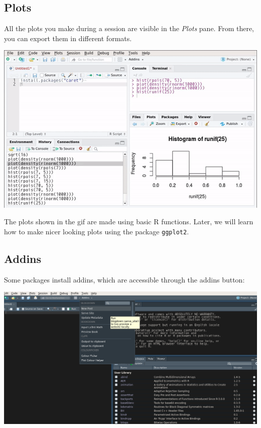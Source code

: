 \documentclass[]{gitbook}
\theoremstyle{definition}
\theoremstyle{definition}
\theoremstyle{definition}
\theoremstyle{remark}
\begin{document}
\hypertarget{plots}{%
\subsection{Plots}\label{plots}}

All the plots you make during a session are visible in the \emph{Plots}
pane. From there, you can export them in different formats.

\includegraphics{pics/rstudio_plots.gif}

The plots shown in the gif are made using basic R functions. Later, we
will learn how to make nicer looking plots using the package
\texttt{ggplot2}.

\hypertarget{addins}{%
\subsection{Addins}\label{addins}}

Some packages install addins, which are accessible through the addins
button:

\includegraphics[width=17.08in]{pics/rstudio_addins}
\end{document}
